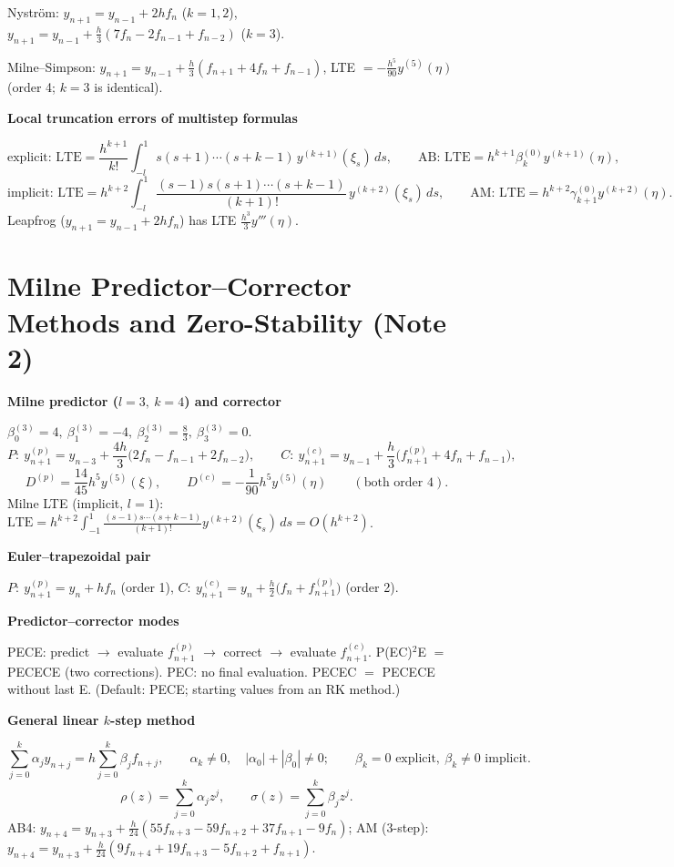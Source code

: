 \documentclass[10pt,a4paper]{article}
\newcommand{\head}[1]{\par\smallskip\noindent\textbf{\color{blue!50!black}#1}\par\nobreak}
\begin{document}
Nystr\"om: \(y_{n+1}=y_{n-1}+2hf_n\) (\(k=1,2\)),\quad
\(y_{n+1}=y_{n-1}+\frac h3(7f_n-2f_{n-1}+f_{n-2})\) (\(k=3\)).

Milne--Simpson: \(y_{n+1}=y_{n-1}+\frac h3(f_{n+1}+4f_n+f_{n-1})\),
LTE \(=-\frac{h^5}{90}y^{(5)}(\eta)\) (order 4; \(k=3\) is identical).

\head{Local truncation errors of multistep formulas}
\[
  \text{explicit: }
  \text{LTE}=\frac{h^{k+1}}{k!}\int_{-l}^1 s(s+1)\cdots(s+k-1)\,y^{(k+1)}(\xi_s)\,ds,
  \qquad
  \text{AB: }\text{LTE}=h^{k+1}\beta_k^{(0)}y^{(k+1)}(\eta),
\]
\[
  \text{implicit: }
  \text{LTE}=h^{k+2}\int_{-l}^1\frac{(s-1)s(s+1)\cdots(s+k-1)}{(k+1)!}\,y^{(k+2)}(\xi_s)\,ds,
  \qquad
  \text{AM: }\text{LTE}=h^{k+2}\gamma_{k+1}^{(0)}y^{(k+2)}(\eta).
\]
Leapfrog (\(y_{n+1}=y_{n-1}+2hf_n\)) has LTE \(\frac{h^3}3y'''(\eta)\).

\section{Milne Predictor--Corrector Methods and Zero-Stability (Note 2)}

\head{Milne predictor (\(l=3,\ k=4\)) and corrector}
\(\beta_0^{(3)}=4,\ \beta_1^{(3)}=-4,\ \beta_2^{(3)}=\frac83,\ \beta_3^{(3)}=0\).
\[
  P:\ y_{n+1}^{(p)}=y_{n-3}+\frac{4h}3\bigl(2f_n-f_{n-1}+2f_{n-2}\bigr),
  \qquad
  C:\ y_{n+1}^{(c)}=y_{n-1}+\frac h3\bigl(f_{n+1}^{(p)}+4f_n+f_{n-1}\bigr),
\]
\[
  D^{(p)}=\frac{14}{45}h^5y^{(5)}(\xi),
  \qquad
  D^{(c)}=-\frac1{90}h^5y^{(5)}(\eta)
  \qquad(\text{both order }4).
\]
Milne LTE (implicit, \(l=1\)):
\(\text{LTE}=h^{k+2}\int_{-1}^1\frac{(s-1)s\cdots(s+k-1)}{(k+1)!}y^{(k+2)}(\xi_s)\,ds=O(h^{k+2})\).

\head{Euler--trapezoidal pair}
\(P:\ y_{n+1}^{(p)}=y_n+hf_n\) (order 1),\qquad
\(C:\ y_{n+1}^{(c)}=y_n+\frac h2\bigl(f_n+f_{n+1}^{(p)}\bigr)\) (order 2).

\head{Predictor--corrector modes}
PECE: predict \(\to\) evaluate \(f^{(p)}_{n+1}\) \(\to\) correct \(\to\)
evaluate \(f^{(c)}_{n+1}\).\;
P(EC)\(^2\)E \(=\) PECECE (two corrections).\;
PEC: no final evaluation.\; PECEC \(=\) PECECE without last E.
(Default: PECE; starting values from an RK method.)

\head{General linear \(k\)-step method}
\[
  \sum_{j=0}^k\alpha_jy_{n+j}=h\sum_{j=0}^k\beta_jf_{n+j},
  \qquad \alpha_k\ne0,\quad |\alpha_0|+|\beta_0|\ne0;
  \qquad \beta_k=0\text{ explicit},\ \beta_k\ne0\text{ implicit}.
\]
\[
  \rho(z)=\sum_{j=0}^k\alpha_jz^j,\qquad
  \sigma(z)=\sum_{j=0}^k\beta_jz^j .
\]
AB4: \(y_{n+4}=y_{n+3}+\frac h{24}(55f_{n+3}-59f_{n+2}+37f_{n+1}-9f_n)\);\quad
AM (3-step): \(y_{n+4}=y_{n+3}+\frac h{24}(9f_{n+4}+19f_{n+3}-5f_{n+2}+f_{n+1})\).
\end{document}
